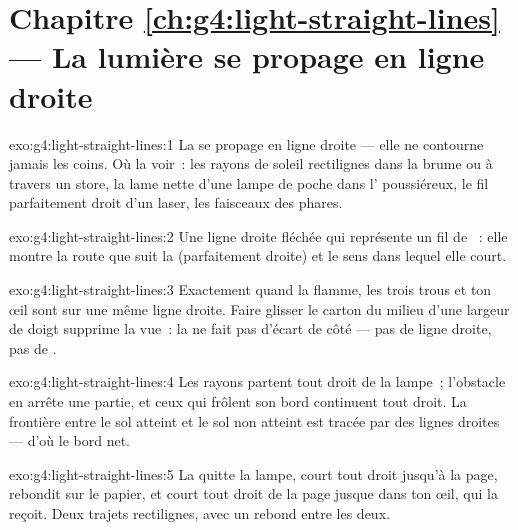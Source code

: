\section*{Chapitre \ref{ch:g4:light-straight-lines} --- La lumière se propage en ligne droite}

\begin{solution}{exo:g4:light-straight-lines:1}
La  se propage en ligne droite --- elle ne contourne jamais
les coins. Où la voir~: les rayons de soleil rectilignes dans la
brume ou à travers un store, la lame nette d'une lampe de poche dans
l' poussiéreux, le fil parfaitement droit d'un laser, les
faisceaux des phares.
\end{solution}

\begin{solution}{exo:g4:light-straight-lines:2}
Une ligne droite fléchée qui représente un fil de ~: elle
montre la route que suit la  (parfaitement droite) et le sens
dans lequel elle court.
\end{solution}

\begin{solution}{exo:g4:light-straight-lines:3}
Exactement quand la flamme, les trois trous et ton œil sont sur une
même ligne droite. Faire glisser le carton du milieu d'une largeur de
doigt supprime la vue~: la  ne fait pas d'écart de côté --- pas
de ligne droite, pas de .
\end{solution}

\begin{solution}{exo:g4:light-straight-lines:4}
Les rayons partent tout droit de la lampe~; l'obstacle en arrête une
partie, et ceux qui frôlent son bord continuent tout droit. La
frontière entre le sol atteint et le sol non atteint est tracée par
des lignes droites --- d'où le bord net.
\end{solution}

\begin{solution}{exo:g4:light-straight-lines:5}
La  quitte la lampe, court tout droit jusqu'à la page, rebondit
sur le papier, et court tout droit de la page jusque dans ton œil,
qui la reçoit. Deux trajets rectilignes, avec un rebond entre les
deux.
\end{solution}

